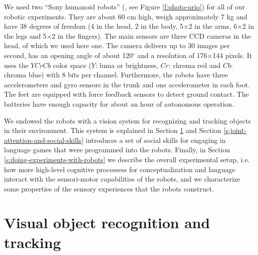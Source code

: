 We used two ``Sony humanoid robots'' (\citealp{fujita03autonomous},
see Figure \ref{f:photo-qrio}) for all of our robotic
experiments. They are about 60 cm high, weigh approximately 7 kg and
have 38 degrees of freedom (4 in the head, 2 in the body, 5$\times$2
in the arms, 6$\times$2 in the legs and 5$\times$2 in the
fingers). The main sensors are three CCD cameras in the head, of which
we used here one. The camera delivers up to 30 images per second, has
an opening angle of about 120$^\circ$ and a resolution of
176$\times$144 pixels. It uses the $YCrCb$ color space ($Y$: luma or
brightness, $Cr$: chroma red and $Cb$: chroma blue) with 8 bits per
channel. Furthermore, the robots have three accelerometers and gyro
sensors in the trunk and one accelerometer in each foot. The feet are
equipped with force feedback sensors to detect ground contact. The
batteries have enough capacity for about an hour of autonomous
operation.

We endowed the robots with a vision system for recognizing and
tracking objects in their environment. This system is explained in
Section \ref{s:vision-system} and Section
\ref{s:joint-attention-and-social-skills} introduces a set of social
skills for engaging in language games that were programmed into the
robots. Finally, in Section \ref{s:doing-experiments-with-robots} we
describe the overall experimental setup, i.e. how more high-level
cognitive processess for conceptualization and language interact with
the sensori-motor capabilities of the robots, and we characterize some
properties of the sensory experiences that the robots construct.



\section{Visual object recognition and tracking}
\label{s:vision-system}

